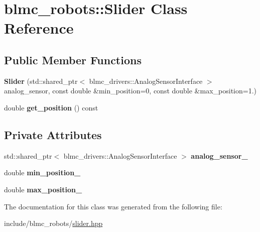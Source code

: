 \hypertarget{classblmc__robots_1_1Slider}{}\section{blmc\+\_\+robots\+:\+:Slider Class Reference}
\label{classblmc__robots_1_1Slider}
\subsection*{Public Member Functions}
\begin{DoxyCompactItemize}
\item 
{\bfseries Slider} (std\+::shared\+\_\+ptr$<$ blmc\+\_\+drivers\+::\+Analog\+Sensor\+Interface $>$ analog\+\_\+sensor, const double \&min\+\_\+position=0, const double \&max\+\_\+position=1.)\hypertarget{classblmc__robots_1_1Slider_a4028fb3e3cb50932b8f73071fe39e9e9}{}\label{classblmc__robots_1_1Slider_a4028fb3e3cb50932b8f73071fe39e9e9}

\item 
double {\bfseries get\+\_\+position} () const \hypertarget{classblmc__robots_1_1Slider_a61e578b7774949cead107c5a6c5d3661}{}\label{classblmc__robots_1_1Slider_a61e578b7774949cead107c5a6c5d3661}

\end{DoxyCompactItemize}
\subsection*{Private Attributes}
\begin{DoxyCompactItemize}
\item 
std\+::shared\+\_\+ptr$<$ blmc\+\_\+drivers\+::\+Analog\+Sensor\+Interface $>$ {\bfseries analog\+\_\+sensor\+\_\+}\hypertarget{classblmc__robots_1_1Slider_a88c34fec2815e94cefed9e050dcc229c}{}\label{classblmc__robots_1_1Slider_a88c34fec2815e94cefed9e050dcc229c}

\item 
double {\bfseries min\+\_\+position\+\_\+}\hypertarget{classblmc__robots_1_1Slider_af5cd281d0a74d037d34a6b4953e008d8}{}\label{classblmc__robots_1_1Slider_af5cd281d0a74d037d34a6b4953e008d8}

\item 
double {\bfseries max\+\_\+position\+\_\+}\hypertarget{classblmc__robots_1_1Slider_a033fb1fb3301cb1e50a3939dcb766134}{}\label{classblmc__robots_1_1Slider_a033fb1fb3301cb1e50a3939dcb766134}

\end{DoxyCompactItemize}


The documentation for this class was generated from the following file\+:\begin{DoxyCompactItemize}
\item 
include/blmc\+\_\+robots/\hyperlink{slider_8hpp}{slider.\+hpp}\end{DoxyCompactItemize}
